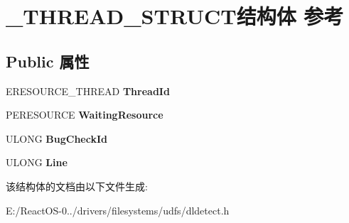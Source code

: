 \hypertarget{struct___t_h_r_e_a_d___s_t_r_u_c_t}{}\section{\+\_\+\+T\+H\+R\+E\+A\+D\+\_\+\+S\+T\+R\+U\+C\+T结构体 参考}
\label{struct___t_h_r_e_a_d___s_t_r_u_c_t}
\subsection*{Public 属性}
\begin{DoxyCompactItemize}
\item 
\mbox{\label{struct___t_h_r_e_a_d___s_t_r_u_c_t_a806edec7f2e6160c33468c6350205026}} 
E\+R\+E\+S\+O\+U\+R\+C\+E\+\_\+\+T\+H\+R\+E\+AD {\bfseries Thread\+Id}
\item 
\mbox{\label{struct___t_h_r_e_a_d___s_t_r_u_c_t_ad7a51851996806a3694978af02cbe24d}} 
P\+E\+R\+E\+S\+O\+U\+R\+CE {\bfseries Waiting\+Resource}
\item 
\mbox{\label{struct___t_h_r_e_a_d___s_t_r_u_c_t_a277b3596e653c902633609de1a5b1e1e}} 
U\+L\+O\+NG {\bfseries Bug\+Check\+Id}
\item 
\mbox{\label{struct___t_h_r_e_a_d___s_t_r_u_c_t_a8a906ca1f846090ade0cdb8484b55921}} 
U\+L\+O\+NG {\bfseries Line}
\end{DoxyCompactItemize}


该结构体的文档由以下文件生成\+:\begin{DoxyCompactItemize}
\item 
E\+:/\+React\+O\+S-\/0../drivers/filesystems/udfs/dldetect.\+h\end{DoxyCompactItemize}
